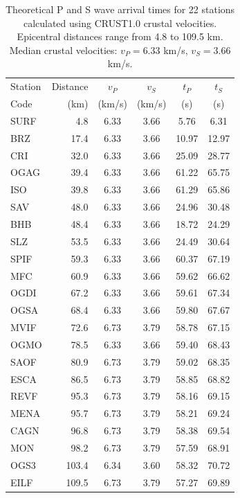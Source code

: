 \begin{table}[htbp]
    \centering
    \caption{Theoretical P and S wave arrival times for 22 stations calculated using CRUST1.0 crustal velocities. Epicentral distances range from 4.8 to 109.5 km. Median crustal velocities: $v_P = 6.33$ km/s, $v_S = 3.66$ km/s.}
    \label{tab:theoretical_arrivals}
    \begin{tabular}{lrcccc}
        \toprule
        Station & Distance & $v_P$ & $v_S$ & $t_P$ & $t_S$ \\
        Code & (km) & (km/s) & (km/s) & (s) & (s) \\
        \midrule
        SURF & 4.8 & 6.33 & 3.66 & 5.76 & 6.31 \\
        BRZ & 17.4 & 6.33 & 3.66 & 10.97 & 12.97 \\
        CRI & 32.0 & 6.33 & 3.66 & 25.09 & 28.77 \\
        OGAG & 39.4 & 6.33 & 3.66 & 61.22 & 65.75 \\
        ISO & 39.8 & 6.33 & 3.66 & 61.29 & 65.86 \\
        SAV & 48.0 & 6.33 & 3.66 & 24.96 & 30.48 \\
        BHB & 48.4 & 6.33 & 3.66 & 18.72 & 24.29 \\
        SLZ & 53.5 & 6.33 & 3.66 & 24.49 & 30.64 \\
        SPIF & 59.3 & 6.33 & 3.66 & 60.37 & 67.19 \\
        MFC & 60.9 & 6.33 & 3.66 & 59.62 & 66.62 \\
        OGDI & 67.2 & 6.33 & 3.66 & 59.61 & 67.34 \\
        OGSA & 68.4 & 6.33 & 3.66 & 59.80 & 67.67 \\
        MVIF & 72.6 & 6.73 & 3.79 & 58.78 & 67.15 \\
        OGMO & 78.5 & 6.33 & 3.66 & 59.40 & 68.43 \\
        SAOF & 80.9 & 6.73 & 3.79 & 59.02 & 68.35 \\
        ESCA & 86.5 & 6.73 & 3.79 & 58.85 & 68.82 \\
        REVF & 95.3 & 6.73 & 3.79 & 58.16 & 69.15 \\
        MENA & 95.7 & 6.73 & 3.79 & 58.21 & 69.24 \\
        CAGN & 96.8 & 6.73 & 3.79 & 58.38 & 69.54 \\
        MON & 98.2 & 6.73 & 3.79 & 57.59 & 68.91 \\
        OGS3 & 103.4 & 6.34 & 3.60 & 58.32 & 70.72 \\
        EILF & 109.5 & 6.73 & 3.79 & 57.27 & 69.89 \\
        \bottomrule
    \end{tabular}
\end{table}
